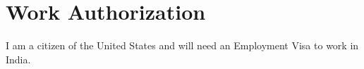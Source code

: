 \section{Work Authorization}
\closesection
I am a citizen of the United States and will need an Employment Visa to work in India.
